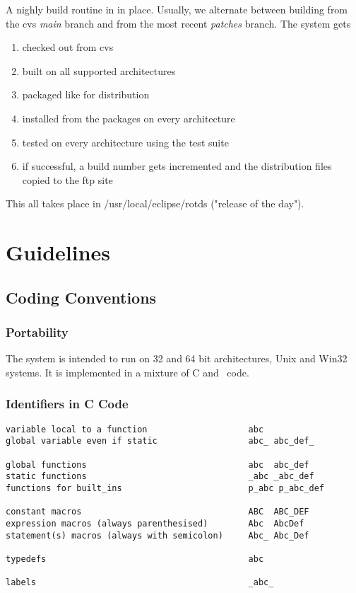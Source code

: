 A nighly build routine in in place. 
Usually, we alternate between building from the cvs
{\it main} branch and from the most recent {\it patches} branch.
The system gets
\begin{enumerate}
\item checked out from cvs
\item built on all supported architectures
\item packaged like for distribution
\item installed from the packages on every architecture
\item tested on every architecture using the test suite
\item if successful, a build number gets incremented and
    the distribution files copied to the ftp site
\end{enumerate}
This all takes place in /usr/local/eclipse/rotds
("release of the day").


\chapter{Guidelines}
\section{Coding Conventions}

\subsection{Portability}

The system is intended to run on 32 and 64 bit architectures,
Unix and Win32 systems. It is implemented in a mixture of
C and \eclipse\ code.


\subsection{Identifiers in C Code}

\begin{verbatim}
variable local to a function                    abc
global variable even if static                  abc_ abc_def_

global functions                                abc  abc_def
static functions                                _abc _abc_def
functions for built_ins                         p_abc p_abc_def

constant macros                                 ABC  ABC_DEF
expression macros (always parenthesised)        Abc  AbcDef
statement(s) macros (always with semicolon)     Abc_ Abc_Def

typedefs                                        abc

labels                                          _abc_
\end{verbatim}

